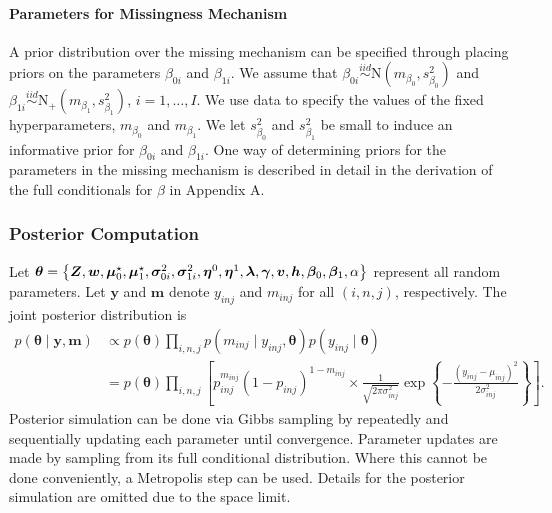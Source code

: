 \documentclass[12pt,]{article}
\newcommand{\bc}[1]{ \left\{#1\right\} }
\newcommand{\N}{ \mathcal{N} }
\newcommand{\iid}{\overset{iid}{\sim}}
\def\N{\text{N}}
\def\btheta{\bm{\theta}}
\def\y{\bm{y}}
\newcommand\m{\bm{m}}
\newcommand{\bZ}{\mbox{\boldmath $Z$}}
\newcommand{\bw}{\mbox{\boldmath $w$}}
\begin{document}
\paragraph*{Parameters for Missingness Mechanism}
A prior distribution over the missing mechanism can be specified through
placing priors on the parameters $\beta_{0i}$ and $\beta_{1i}$. 
%
We assume that $\beta_{0i} \iid \N(m_{\beta_0}, s^2_{\beta_0})$ and $\beta_{1i}
\iid \N_+(m_{\beta_1}, s^2_{\beta_1})$, $i=1, \ldots, I$.  We use data to
specify the values of the fixed hyperparameters, $m_{\beta_0}$ and
$m_{\beta_1}$. We let $s^2_{\beta_0}$ and $s^2_{\beta_1}$ be small to induce an
informative prior for $\beta_{0i}$ and $\beta_{1i}$. One way of determining
priors for the parameters in the missing mechanism is described in detail in 
the derivation of the full conditionals for $\beta$ in Appendix A.



\subsubsection{Posterior Computation}\label{sampling-via-mcmc}
Let $\btheta=\bc{\bZ, \bw, \bm \mu^\star_0, \bm \mu^\star_1, \bm \sigma^2_{0i},
\bm \sigma^2_{1i}, \bm \eta^0, \bm \eta^1, \bm \lambda, \bm \gamma, \bm v, \bm
h, \bm \beta_0, \bm \beta_1, \alpha}$ represent all random parameters.  Let
\(\y\) and $\m$ denote $y_{inj}$ and $m_{inj}$ for all $(i,n,j)$, respectively.
The joint posterior distribution is 
\begin{align*}
p(\btheta \mid \y, \m) &\propto 
p(\btheta) \prod_{i,n,j} p(m_{inj} \mid y_{inj}, \btheta) p(y_{inj} \mid \btheta) \nonumber\\
&=  
p(\btheta)
\prod_{i,n,j} \left[
  p_{inj}^{m_{inj}} (1-p_{inj})^{1-m_{inj}} \times 
   \frac{1}{\sqrt{2\pi\sigma^2_{inj}}} \exp\bc{-\frac{(y_{inj}-\mu_{inj})^2}{2\sigma^2_{inj}}}
\right].
\end{align*}
Posterior simulation can be done via Gibbs sampling by repeatedly and
sequentially updating each parameter until convergence. Parameter updates are
made by sampling from its full conditional distribution. Where this cannot be
done conveniently, a Metropolis step can be used.  Details for the posterior
simulation are omitted due to the space limit.  %
\end{document}
